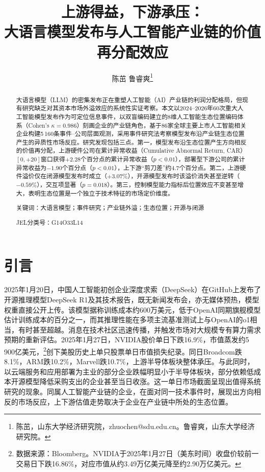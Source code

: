 \documentclass[11pt,fontset=fandol,a4paper]{ctexart}
\title{上游得益，下游承压：\\大语言模型发布与人工智能产业链的价值再分配效应}
\author{陈茁 \quad 鲁睿爽\thanks{陈茁，山东大学经济研究院，zhuochen@sdu.edu.cn。鲁睿爽，山东大学经济研究院。}}
\date{}
\newcommand{\changed}[1]{#1}
\newcommand{\revise}[1]{#1}
\begin{document}
\renewcommand{\thefootnote}{\fnsymbol{footnote}}
\maketitle
\setcounter{footnote}{0}
\renewcommand{\thefootnote}{\arabic{footnote}}

\begin{abstract}
\noindent\changed{大语言模型（LLM）的密集发布正在重塑人工智能（AI）产业链的利润分配格局，但现有研究缺乏对其资本市场外溢效应的系统性实证考察。本文以2024--2026年60次重大人工智能模型发布作为可定位信息事件，以双盲编码建立的8维人工智能生态位置编码体系（Cohen's $\kappa=0.986$）刻画企业的产业链角色，基于86家全球主要上市人工智能相关企业构建5\,160条事件--公司层面观测，采用事件研究法考察模型发布沿产业链生态位置产生的异质性市场反应。研究发现包括三点。第一，模型发布沿生态位置产生方向相反的价值再分配，上游硬件公司在\revise{累计异常收益（Cumulative Abnormal Return, CAR）}$[0,+20]$窗口获得$+2.28$个百分点的累计异常收益（$p<0.01$），部署型下游公司的累计异常收益为$-1.90$个百分点（$p<0.01$），上下游“剪刀差”约4.7个百分点。第二，上游硬件溢价仅在闭源模型发布时成立（$+3.07\%$），开源模型发布时该溢价消失甚至逆转（$-0.59\%$），交互项显著（$p=0.018$）。第三，控制模型能力指标后位置效应不变甚至增大，表明生态位置是一个独立于技术特征的市场定价维度。}

\vspace{0.5em}
\noindent 关键词：大语言模型；事件研究；产业链外溢；生态位置；开源与闭源

\vspace{0.3em}
\noindent JEL分类号：G14\quad O33\quad L14
\end{abstract}

\section{引言}

\changed{2025年1月20日，中国人工智能初创企业深度求索（DeepSeek）在GitHub上发布了开源推理模型DeepSeek R1及其技术报告，既无新闻发布会，亦无媒体预热，模型权重直接公开上传。该模型据称训练成本约600万美元，低于OpenAI同期旗舰模型估计训练成本的百分之一，而其推理性能在多项主流基准测试上与OpenAI的o1相当，有时甚至超越。消息在技术社区迅速传播，并触发市场对大规模专有算力需求预期的重新评估。2025年1月27日，NVIDIA股价单日下跌16.9\%，市值蒸发约5\,900亿美元，\footnote{数据来源：Bloomberg。NVIDIA于2025年1月27日（美东时间）收盘价较前一交易日下跌16.86\%，对应市值从约3.49万亿美元降至约2.90万亿美元。}创下美股历史上单只股票单日市值损失纪录。同日Broadcom跌8.1\%，ARM跌10.2\%，Marvell跌10.7\%，上游半导体板块整体承压。与此同时，以云端服务和应用部署为主业的部分企业跌幅明显小于半导体板块，部分依赖低成本开源模型降低采购支出的企业甚至当日收涨。这一单日市场截面呈现出值得系统研究的现象。同属人工智能产业链的企业，在面对同一技术事件时，展现出方向相反的市场反应，上下游估值走势取决于企业在产业链中所处的生态位置。}
\end{document}
